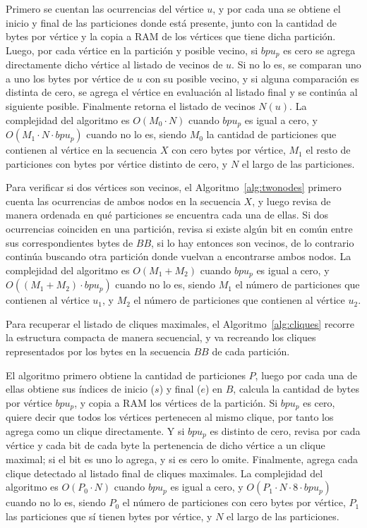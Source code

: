 Primero se cuentan las ocurrencias del vértice $u$, y por cada una se obtiene el inicio y final de las particiones donde está presente, junto con la cantidad de bytes por vértice y la copia a RAM de los vértices que tiene dicha partición. Luego, por cada vértice en la partición y posible vecino, si $bpu_{p}$ es cero se agrega directamente dicho vértice al listado de vecinos de $u$. Si no lo es, se comparan uno a uno los bytes por vértice de $u$ con su posible vecino, y si alguna comparación es distinta de cero, se agrega el vértice en evaluación al listado final y se continúa al siguiente posible. Finalmente retorna el listado de vecinos $N(u)$. La complejidad del algoritmo es $O(M_{0} \cdot N)$ cuando $bpu_{p}$ es igual a cero, y $O(M_{1} \cdot N \cdot bpu_{p})$ cuando no lo es, siendo $M_{0}$ la cantidad de particiones que contienen al vértice en la secuencia $X$ con cero bytes por vértice, $M_{1}$ el resto de particiones con bytes por vértice distinto de cero, y $N$ el largo de las particiones.

Para verificar si dos vértices son vecinos, el Algoritmo~\ref{alg:twonodes}  primero cuenta las ocurrencias de ambos nodos en la secuencia $X$, y luego revisa de manera ordenada en qué particiones se encuentra cada una de ellas. Si dos ocurrencias coinciden en una partición, revisa si existe algún bit en común entre sus correspondientes bytes de $BB$, si lo hay entonces son vecinos, de lo contrario continúa buscando otra partición donde vuelvan a encontrarse ambos nodos. La complejidad del algoritmo es $O(M_{1} + M_{2})$ cuando $bpu_{p}$ es igual a cero, y $O((M_{1} + M_{2}) \cdot bpu_{p})$ cuando no lo es, siendo $M_{1}$ el número de particiones que contienen al vértice $u_{1}$, y $M_{2}$ el número de particiones que contienen al vértice $u_{2}$.

Para recuperar el listado de cliques maximales, el Algoritmo~\ref{alg:cliques} recorre la estructura compacta de manera secuencial, y va recreando los cliques representados por los bytes en la secuencia $BB$ de cada partición.

El algoritmo primero obtiene la cantidad de particiones $P$, luego por cada una de ellas obtiene sus índices de inicio ($s$) y final ($e$) en $B$, calcula la cantidad de bytes por vértice $bpu_{p}$, y copia a RAM los vértices de la partición. Si $bpu_{p}$ es cero, quiere decir que todos los vértices pertenecen al mismo clique, por tanto los agrega como un clique directamente. Y si $bpu_{p}$ es distinto de cero, revisa por cada vértice y cada bit de cada byte la pertenencia de dicho vértice a un clique maximal; si el bit es uno lo agrega, y si es cero lo omite. Finalmente, agrega cada clique detectado al listado final de cliques maximales. La complejidad del algoritmo es $O(P_{0} \cdot N)$ cuando $bpu_{p}$ es igual a cero, y $O(P_{1} \cdot N \cdot 8 \cdot bpu_{p})$ cuando no lo es, siendo $P_{0}$ el número de particiones con cero bytes por vértice, $P_{1}$ las particiones que sí tienen bytes por vértice, y $N$ el largo de las particiones.

